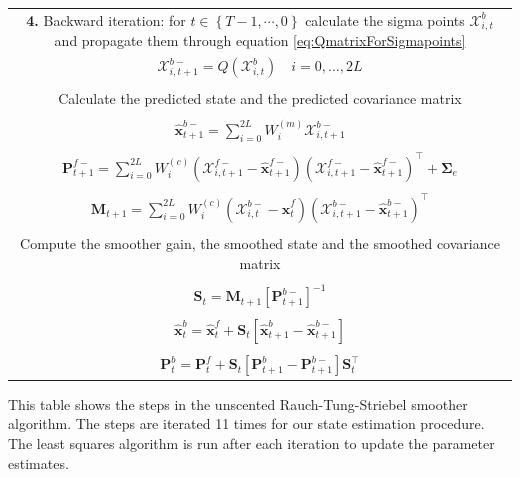 \documentclass[10pt]{article}
\begin{document}
\begin{table}[!ht]
\begin{tabular}{|c|}
\multicolumn{1}{|p{16cm}|}{\textbf{4.} Backward iteration: for $t \in \left\lbrace T-1, \cdots, 0 \right\rbrace $ calculate the sigma points $\mathcal X_{i,t}^b$ and propagate them through equation \ref{eq:QmatrixForSigmapoints}}\\
$\mathcal X_{i,t+1}^{b-}=Q(\mathcal X_{i,t}^b) \quad i=0, \dots, 2L$\\
\\
\multicolumn{1}{|p{16cm}|}{Calculate the predicted state and the predicted covariance matrix}\\
\\
$\hat{\mathbf x}_{t+1}^{b-}=\sum_{i=0}^{2L} W_i^{(m)}\mathcal X_{i,t+1}^{b-}$\\
\\
$\mathbf P_{t +1}^{f-}=\sum_{i=0}^{2L} W_i^{(c)}(\mathcal X_{i,t+1}^{f-}-\hat{\mathbf x}_{t +1}^{f-})(\mathcal X_{i,t+1}^{f-}-\hat{\mathbf x}_{t +1}^{f-})^\top+\boldsymbol \Sigma_e $\\
\\
$\mathbf M_{t +1}=\sum_{i=0}^{2L} W_i^{(c)}(\mathcal X_{i,t}^{b-}-\hat{\mathbf x}_{t}^{f})(\mathcal X_{i,t+1}^{b-}-\hat{\mathbf x}_{t+1}^{b-})^\top$\\
\\
\multicolumn{1}{|p{16cm}|}{Compute the smoother gain, the smoothed state and the smoothed covariance matrix}\\
\\
$\mathbf S_t=\mathbf M_{t +1}\left[ \mathbf P_{t +1}^{b-}\right] ^{-1} $\\
\\
$\hat{\mathbf x}_t^b=\hat{\mathbf x}_t^f+\mathbf S_t\left[\hat{\mathbf x}_{t+1}^{b}-\hat{\mathbf x}_{t+1}^{b-}\right]$\\
\\
$\mathbf P_{t}^{b}=\mathbf P_{t}^{f}+\mathbf S_t\left[\mathbf P_{t+1}^{b}-\mathbf P_{t+1}^{b-} \right]\mathbf S_t^\top $\\\hline
\end{tabular}
\begin{flushleft}This table shows the steps in the unscented Rauch-Tung-Striebel smoother algorithm. The steps are iterated 11 times for our state estimation procedure. The least squares algorithm is run after each iteration to update the parameter estimates.
\end{flushleft}
\label{tab:UKFAlgorithm}
\end{table}
\end{document}
